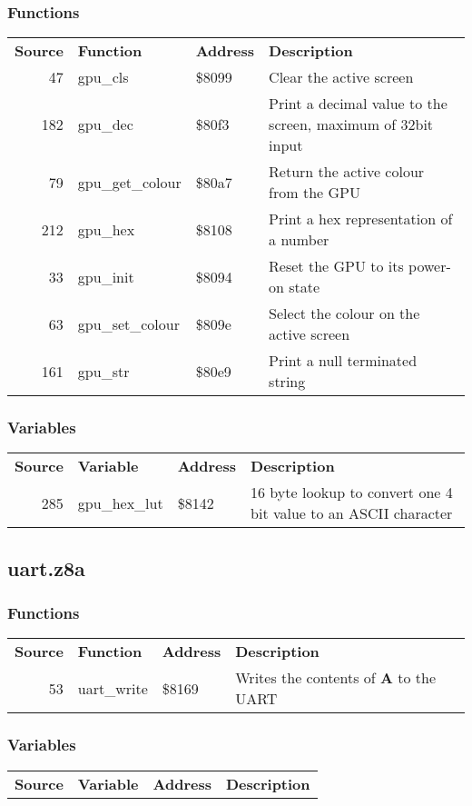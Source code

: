 \subsubsection{Functions}
\begin{tabular}{rllp{7cm}}
 \textbf{Source}&\textbf{Function}&\textbf{Address}&\textbf{Description}\\
 47&gpu\_cls&\$8099&Clear the active screen\\
 182&gpu\_dec&\$80f3&Print a decimal value to the screen, maximum of 32bit input\\
 79&gpu\_get\_colour&\$80a7&Return the active colour from the GPU\\
 212&gpu\_hex&\$8108&Print a hex representation of a number\\
 33&gpu\_init&\$8094&Reset the GPU to its power-on state\\
 63&gpu\_set\_colour&\$809e&Select the colour on the active screen\\
 161&gpu\_str&\$80e9&Print a null terminated string\\
\end{tabular}

\subsubsection{Variables}
\begin{tabular}{rllp{7cm}}
 \textbf{Source}&\textbf{Variable}&\textbf{Address}&\textbf{Description}\\
 285&gpu\_hex\_lut&\$8142&16 byte lookup to convert one 4 bit value to an ASCII character\\
\end{tabular}

\subsection{uart.z8a}
\subsubsection{Functions}
\begin{tabular}{rllp{7cm}}
 \textbf{Source}&\textbf{Function}&\textbf{Address}&\textbf{Description}\\
 53&uart\_write&\$8169&Writes the contents of \textbf{A} to the UART\\
\end{tabular}

\subsubsection{Variables}
\begin{tabular}{rllp{7cm}}
 \textbf{Source}&\textbf{Variable}&\textbf{Address}&\textbf{Description}\\
\end{tabular}

